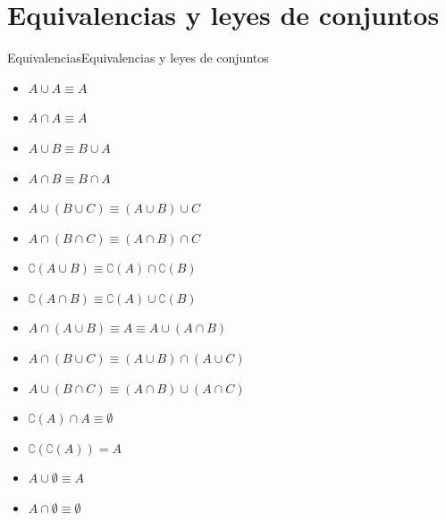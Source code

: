 \documentclass[spanish, c]{beamer}
\begin{document}
\section{Equivalencias y leyes de conjuntos}

\begin{frame}{Equivalencias}{Equivalencias y leyes de conjuntos}

    \begin{itemize}
        \item $A \cup A \equiv A$
        \item $A \cap A \equiv A$
        \item $A \cup B \equiv B \cup A$
        \item $A \cap B \equiv B \cap A$
        \item $A \cup (B \cup C) \equiv (A \cup B) \cup C$
        \item $A \cap (B \cap C) \equiv (A \cap B) \cap C$
        \item $\complement(A \cup B) \equiv \complement(A) \cap \complement(B)$
        \item $\complement(A \cap B) \equiv \complement(A) \cup \complement(B)$
        \item $A \cap (A \cup B) \equiv A \equiv A \cup (A \cap B)$
        \item $A \cap (B \cup C) \equiv (A \cup B) \cap (A \cup C)$
        \item $A \cup (B \cap C) \equiv (A \cap B) \cup (A \cap C)$
        \item $\complement(A) \cap A \equiv \emptyset$
        \item $\complement(\complement(A)) = A$
        \item $A \cup \emptyset \equiv A$
        \item $A \cap \emptyset \equiv \emptyset$
    \end{itemize}
\end{frame}

% 




\end{document}
